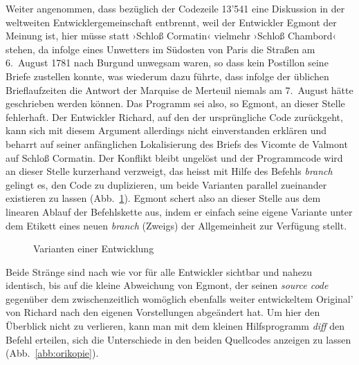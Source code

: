 \documentclass[a4paper,11pt]{article}
\newcommand{\inanf}[1]{›#1‹}
\begin{document}
Weiter angenommen, dass bezüglich der Codezeile 13'541 eine Diskussion in der weltweiten Entwicklergemeinschaft entbrennt, weil der Entwickler {\color{hokkaido}Egmont} der Meinung ist, hier müsse statt \inanf{Schloß Cormatin} vielmehr \inanf{Schloß Chambord} stehen, da infolge eines Unwetters im Südosten von Paris die Straßen am 6.~August 1781 nach Burgund unwegsam waren, so dass kein Postillon seine Briefe zustellen konnte, was wiederum dazu führte, dass infolge der üblichen Brieflaufzeiten die Antwort der Marquise de Merteuil niemals am 7.~August hätte geschrieben werden können. Das Programm sei also, so {\color{hokkaido}Egmont}, an dieser Stelle fehlerhaft. Der Entwickler {\color{dzug}Richard}, auf den der ursprüngliche Code zurückgeht, kann sich mit diesem Argument allerdings nicht einverstanden erklären und beharrt auf seiner anfänglichen Lokalisierung des Briefs des Vicomte de Valmont auf Schloß Cormatin. Der Konflikt bleibt ungelöst und der Programmcode wird an dieser Stelle kurzerhand verzweigt, das heisst mit Hilfe des Befehls \emph{branch} gelingt es, den Code zu duplizieren, um beide Varianten parallel zueinander existieren zu lassen (Abb.~\ref{abb:ori}). {\color{hokkaido}Egmont} schert also an dieser Stelle aus dem linearen Ablauf der Befehlskette aus, indem er einfach seine eigene Variante unter dem Etikett eines neuen \emph{branch} (Zweigs) der Allgemeinheit zur Verfügung stellt.

\begin{figure}[hpt]
\begin{center}
\end{center}
\caption{Varianten einer Entwicklung}\label{abb:ori}
\end{figure}

Beide Stränge sind nach wie vor für alle Entwickler sichtbar und nahezu identisch, bis auf die kleine Abweichung von {\color{hokkaido}Egmont}, der seinen \emph{source code} gegenüber dem zwischenzeitlich womöglich ebenfalls weiter entwickeltem Original' von {\color{dzug}Richard} nach den eigenen Vorstellungen abgeändert hat. Um hier den Überblick nicht zu verlieren, kann man mit dem kleinen Hilfsprogramm \emph{diff} den Befehl erteilen, sich die Unterschiede in den beiden Quellcodes anzeigen zu lassen (Abb.~\ref{abb:orikopie}).
\end{document}
